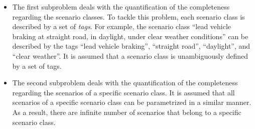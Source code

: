 \documentclass[10pt,final,a4paper,oneside,onecolumn]{article}
\theoremstyle{plain}\newtheorem{definition}{Definition}[section]    %
\theoremstyle{definition}\newtheorem{example}{Example}[section]     %
\theoremstyle{remark}\newtheorem{remarkenv}{Remark}[section]        %
\begin{document}
\begin{itemize}
	\item The first subproblem deals with the quantification of the completeness regarding the scenario classes. To tackle this problem, each scenario class is described by a set of \emph{tags}. For example, the scenario class ``lead vehicle braking at straight road, in daylight, under clear weather conditions'' can be described by the tags ``lead vehicle braking'', ``straight road'', ``daylight'', and ``clear weather''. It is assumed that a scenario class is unambiguously defined by a set of tags.
	\item The second subproblem deals with the quantification of the completeness regarding the scenarios of a specific scenario class. It is assumed that all scenarios of a specific scenario class can be parametrized in a similar manner. As a result, there are infinite number of scenarios that belong to a specific scenario class.
\end{itemize}


%		
\end{document}
